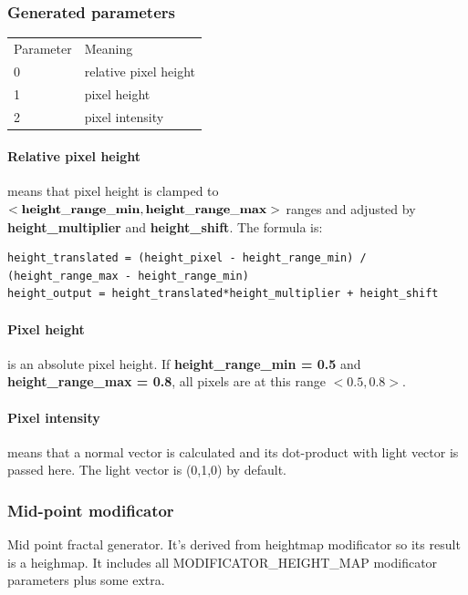 \documentclass[9pt]{article}
\begin{document}
\subsubsection*{Generated parameters}
\begin{tabular}{|l||l|}
  Parameter & Meaning \\
  0 & relative pixel height \\
  1 & pixel height \\
  2 & pixel intensity \\
\end{tabular}

\paragraph*{Relative pixel height}
means that pixel height is clamped to \begin{math}{\bf<height\_range\_min, height\_range\_max>}\end{math}
ranges and adjusted by {\bf height\_multiplier} and {\bf height\_shift}.
The formula is:
\begin{verbatim}
height_translated = (height_pixel - height_range_min) / (height_range_max - height_range_min)
height_output = height_translated*height_multiplier + height_shift
\end{verbatim}

\paragraph*{Pixel height} is an absolute pixel height. 
If {\bf height\_range\_min = 0.5} and {\bf height\_range\_max = 0.8},
all pixels are at this range \begin{math}<0.5,0.8>\end{math}.

\paragraph*{Pixel intensity} means that a normal vector is 
calculated and its dot-product with light vector 
is passed here. The light vector is (0,1,0) by default.

\subsubsection{Mid-point modificator}

Mid point fractal generator. It's derived from heightmap modificator
so its result is a heighmap. It includes all MODIFICATOR\_HEIGHT\_MAP modificator 
parameters plus some extra.
\end{document}
